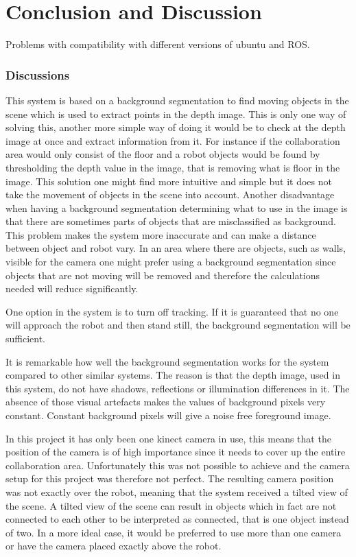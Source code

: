 \section{Conclusion and Discussion}
Problems with compatibility with different versions of ubuntu and ROS.  

\subsubsection{Discussions}
This system is based on a background segmentation to find moving objects in the scene which is used to extract points in the depth image. This is only one way of solving this, another more simple way of doing it would be to check at the depth image at once and extract information from it. For instance if the collaboration area would only consist of the floor and a robot objects would be found by thresholding the depth value in the image, that is removing what is floor in the image. This solution one might find more intuitive and simple but it does not take the movement of objects in the scene into account. Another disadvantage when having a background segmentation determining what to use in the image is that there are sometimes parts of objects that are misclassified as background. This problem makes the system more inaccurate and can make a distance between object and robot vary. In an area where there are objects, such as walls, visible for the camera one might prefer using a background segmentation since objects that are not moving will be removed and therefore the calculations needed will reduce significantly.  

One option in the system is to turn off tracking. If it is guaranteed that no one will approach the robot and then stand still, the background segmentation will be sufficient.  

It is remarkable how well the background segmentation works for the system compared to other similar systems. The reason is that the depth image, used in this system, do not have shadows, reflections or illumination differences in it. The absence of those visual artefacts makes the values of background pixels very constant. Constant background pixels will give a noise free foreground image. 

In this project it has only been one kinect camera in use, this means that the position of the camera is of high importance since it needs to cover up the entire collaboration area. Unfortunately this was not possible to achieve and the camera setup for this project was therefore not perfect. The resulting camera position was not exactly over the robot, meaning that the system received a tilted view of the scene. A tilted view of the scene can result in objects which in fact are not connected to each other to be interpreted as connected, that is one object instead of two. In a more ideal case, it would be preferred to use more than one camera or have the camera placed exactly above the robot. 

